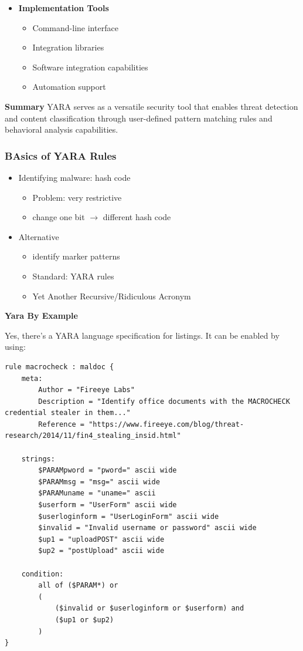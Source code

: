 \begin{itemize}
    \item \textbf{Implementation Tools}
        \begin{itemize}
            \item Command-line interface
            \item Integration libraries
            \item Software integration capabilities
            \item Automation support
        \end{itemize}
\end{itemize}

\textbf{Summary}
YARA serves as a versatile security tool that enables threat detection and content classification through user-defined pattern matching rules and behavioral analysis capabilities.

\subsubsection{BAsics of YARA Rules}
\begin{itemize}
  \item Identifying malware: hash code
  \begin{itemize}
    \item Problem: very restrictive
    \item change one bit $\rightarrow$ different hash code
  \end{itemize}
  \item Alternative
  \begin{itemize}
    \item identify marker patterns
    \item Standard: YARA rules
    \item Yet Another Recursive/Ridiculous Acronym
  \end{itemize}
\end{itemize}

\textbf{Yara By Example}

Yes, there's a YARA language specification for listings. It can be enabled by using:

\begin{lstlisting}[language=YARA]
rule macrocheck : maldoc {
    meta:
        Author = "Fireeye Labs"
        Description = "Identify office documents with the MACROCHECK credential stealer in them..."
        Reference = "https://www.fireeye.com/blog/threat-research/2014/11/fin4_stealing_insid.html"
    
    strings:
        $PARAMpword = "pword=" ascii wide
        $PARAMmsg = "msg=" ascii wide
        $PARAMuname = "uname=" ascii
        $userform = "UserForm" ascii wide
        $userloginform = "UserLoginForm" ascii wide
        $invalid = "Invalid username or password" ascii wide
        $up1 = "uploadPOST" ascii wide
        $up2 = "postUpload" ascii wide
    
    condition:
        all of ($PARAM*) or 
        (
            ($invalid or $userloginform or $userform) and 
            ($up1 or $up2)
        )
}
\end{lstlisting}

